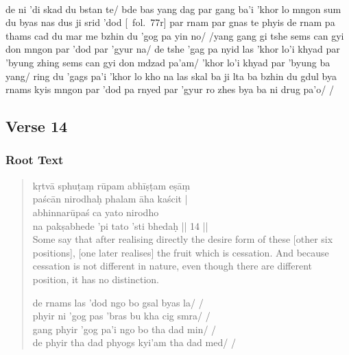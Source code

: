 \documentclass[12pt]{article}
\begin{document}
\textbf{\TVB}\\
de ni 'di skad du bstan te/ bde bas yang dag par gang ba'i 'khor lo mngon sum du byas nas dus ji srid 'dod [\TVB\ fol.\ 77r] par rnam par gnas te phyis de rnam pa thams cad du mar me bzhin du 'gog pa yin no/ /yang gang gi tshe sems can gyi don mngon par 'dod par 'gyur na/ de tshe 'gag pa nyid las 'khor lo'i khyad par 'byung zhing sems can gyi don mdzad pa'am/ 'khor lo'i khyad par 'byung ba yang/ ring du 'gags pa'i 'khor lo kho na las skal ba ji lta ba bzhin du gdul bya rnams kyis mngon par 'dod pa rnyed par 'gyur ro zhes bya ba ni drug pa'o/ /

\subsection{Verse 14}
\subsubsection{Root Text}
\begin{quote}
	kṛtvā sphuṭaṃ rūpam abhīṣṭam eṣāṃ \\
	paścān nirodhaḥ\footnoteB{
		nirodhaḥ] \emd ; nirodha(ṃ) \MSS\ (\emph{this may be corrected to ḥ}); nirodhaṃ \EDD
	} phalam āha kaścit |\\
	abhinnarūpaś ca yato nirodho \\
	na pakṣabhede 'pi tato 'sti bhedaḥ || 14 ||\\
 
	Some say that after realising directly the desire form of these [other six positions], [one later realises] the fruit which is cessation.
	And because cessation is not different in nature, even though there are different position, it has no distinction.

	de rnams las 'dod ngo bo gsal byas la/ /\\
	phyir ni 'gog pas 'bras bu kha cig smra/ /\\
	gang phyir 'gog pa'i ngo bo tha dad min/ /\\
	de phyir tha dad phyogs kyi'am tha dad med/ / 
\end{quote}
\end{document}
